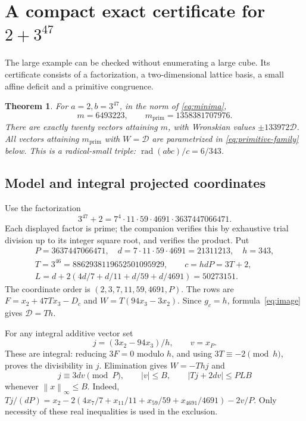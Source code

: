 \documentclass[11pt,a4paper]{article}
\newtheorem{theorem}{Theorem}[section]
\theoremstyle{definition}\newtheorem{question}[theorem]{Question}
\theoremstyle{remark}\newtheorem{remark}[theorem]{Remark}
\newcommand{\Dgen}{\mathcal D}\newcommand{\mpr}{m_{\mathrm{prim}}}
\newcommand{\norm}[1]{\left\lVert#1\right\rVert_\infty}
\DeclareMathOperator{\rad}{rad}\DeclareMathOperator{\supp}{supp}
\begin{document}
\section{A compact exact certificate for \texorpdfstring{\(2+3^{47}\)}{2 plus 3 to the power 47}}\label{sec:k47}
The large example can be checked without enumerating a large cube.
Its certificate consists of a factorization, a two-dimensional lattice
basis, a small affine deficit and a primitive congruence.

\begin{theorem}\label{thm:k47}
For \(a=2,b=3^{47}\), in the norm of \eqref{eq:minima},
\[
 m=6493223,\qquad \mpr=1358381707976.
\]
There are exactly twenty vectors attaining \(m\), with Wronskian
values \(\pm133972\Dgen\).
All vectors attaining \(\mpr\) with \(W=\Dgen\) are parametrized in
\eqref{eq:primitive-family} below.
This is a radical-small triple:
\(\rad(abc)/c=6/343\).
\end{theorem}

\subsection{Model and integral projected coordinates}
Use the factorization
\begin{equation}\label{eq:k47-factor}
 3^{47}+2=7^4\cdot11\cdot59\cdot4691\cdot3637447066471.
\end{equation}
Each displayed factor is prime; the companion verifies this by exhaustive
trial division up to its integer square root, and verifies the product.
Put
\[
 \begin{gathered}
 P=3637447066471,\quad d=7\cdot11\cdot59\cdot4691=21311213,\quad h=343,\\
 T=3^{46}=8862938119652501095929,\qquad c=hdP=3T+2,\\
 L=d+2\left(4d/7+d/11+d/59+d/4691\right)=50273151.
 \end{gathered}
\]
The coordinate order is \((2,3,7,11,59,4691,P)\).
The rows are \(F=x_2+47Tx_3-D_c\) and
\(W=T(94x_3-3x_2)\).
Since \(g_c=h\), formula~\eqref{eq:image} gives \(\Dgen=Th\).

For any integral additive vector set
\[
 j=(3x_2-94x_3)/h,\qquad v=x_P.
\]
These are integral: reducing \(3F=0\) modulo \(h\), and using
\(3T\equiv-2\pmod h\), proves the divisibility in \(j\).
Elimination gives \(W=-Thj\) and
\begin{equation}\label{eq:projected}
 j\equiv3dv\pmod P,\qquad
 |v|\le B,\qquad |Tj+2dv|\le PLB
\end{equation}
whenever \(\norm{x}\le B\).
Indeed,
\(Tj/(dP)=x_2-2(4x_7/7+x_{11}/11+x_{59}/59+x_{4691}/4691)-2v/P\).
Only necessity of these real inequalities is used in the exclusion.
\end{document}
